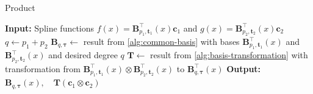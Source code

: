 \begin{algorithm}
    \caption{Product}\label{alg:multiplication}
    \begin{algorithmic}[1]
        \State \textbf{Input:} Spline functions $f(x) = \mathbf{B}_{p_1, \mathbf{t}_1}^{\top}(x) \mathbf{c}_1$ and $g(x) = \mathbf{B}_{p_2, \mathbf{t}_2}^{\top}(x) \mathbf{c}_2$
        \State $q \gets p_1 + p_2$
        \State $\mathbf B_{q, \boldsymbol{\tau}} \gets $ result from \cref{alg:common-basis} with bases $\mathbf{B}_{p_1, \mathbf{t}_1}^{\top}(x)$ and $\mathbf{B}_{p_2, \mathbf{t}_2}^{\top}(x)$ and desired degree $q$
        \State $\mathbf T \gets $ result from \cref{alg:basis-transformation} with transformation from $\mathbf B_{p_1, \mathbf{t}_1}^{\top}(x) \otimes \mathbf B_{p_2, \mathbf{t}_2}^{\top}(x)$ to $\mathbf B_{q, \boldsymbol{\tau}}^{\top}(x)$
        \State \textbf{Output:} $\mathbf B_{q, \boldsymbol{\tau}}(x), \quad\mathbf T (\mathbf c_1 \otimes \mathbf c_2)$
    \end{algorithmic}
\end{algorithm}



